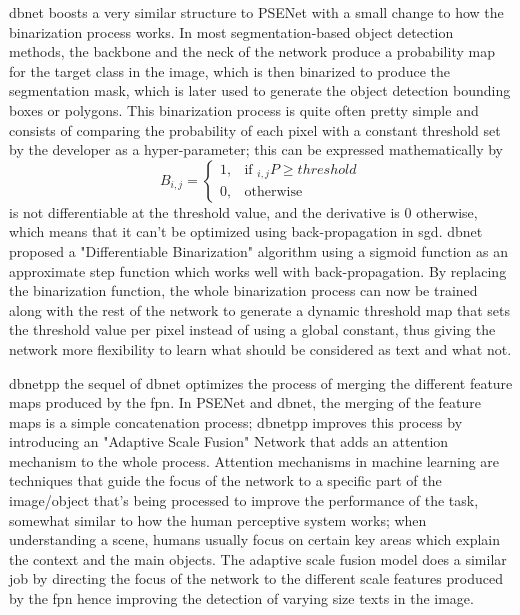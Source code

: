 \label{dbnet}\gls{dbnet} \cite{liao_real-time_2019} boosts a very similar structure to PSENet with a small change to how the binarization process works. In most segmentation-based object detection methods, the backbone and the neck of the network produce a probability map for the target class in the image, which is then binarized to produce the segmentation mask, which is later used to generate the object detection bounding boxes or polygons. This binarization process is quite often pretty simple and consists of comparing the probability of each pixel with a constant threshold set by the developer as a hyper-parameter; this can be expressed mathematically by
\begin{equation}
    B_{i,j} = 
    \begin{cases}
        1,& \text{if }_{i,j} P\geq threshold\\
        0,              & \text{otherwise}
    \end{cases}
\end{equation}
is not differentiable at the threshold value, and the derivative is $0$ otherwise, which means that it can't be optimized using back-propagation in \gls{sgd}. \gls{dbnet} proposed a "Differentiable Binarization" algorithm using a sigmoid function as an approximate step function which works well with back-propagation. By replacing the binarization function, the whole binarization process can now be trained along with the rest of the network to generate a dynamic threshold map that sets the threshold value per pixel instead of using a global constant, thus giving the network more flexibility to learn what should be considered as text and what not.

\label{dbnetpp}\gls{dbnetpp} \cite{liao_real-time_2023} the sequel of \gls{dbnet} optimizes the process of merging the different feature maps produced by the \gls{fpn}. In PSENet and \gls{dbnet}, the merging of the feature maps is a simple concatenation process; \gls{dbnetpp} improves this process by introducing an "Adaptive Scale Fusion" Network that adds an attention mechanism to the whole process. Attention mechanisms in machine learning are techniques that guide the focus of the network to a specific part of the image/object that's being processed to improve the performance of the task, somewhat similar to how the human perceptive system works; when understanding a scene, humans usually focus on certain key areas which explain the context and the main objects. The adaptive scale fusion model does a similar job by directing the focus of the network to the different scale features produced by the \gls{fpn} hence improving the detection of varying size texts in the image.

